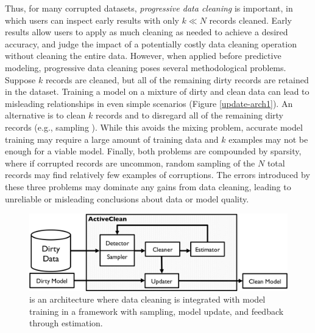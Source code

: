 Thus, for many corrupted datasets, \emph{progressive data cleaning} is important, in which users can inspect early results with only $k \ll N$ records cleaned.
Early results allow users to apply as much cleaning as needed to achieve a desired accuracy, and judge the impact of a potentially costly data cleaning operation without cleaning the entire data.
However, when applied before predictive modeling, progressive data cleaning poses several methodological problems.
Suppose $k$ records are cleaned, but all of the remaining dirty records are retained in the dataset.
Training a model on a mixture of dirty and clean data can lead to misleading relationships in even simple scenarios (Figure \ref{update-arch1}).
An alternative is to clean $k$ records and to disregard all of the remaining dirty records (e.g., sampling \cite{wang1999sample}).
While this avoids the mixing problem, accurate model training may require a large amount of training data and $k$ examples may not be enough for a viable model.
Finally, both problems are compounded by sparsity, where if corrupted records are uncommon, random sampling of the $N$ total records may find relatively few examples of corruptions.
The errors introduced by these three problems may dominate any gains from data cleaning, leading to unreliable or misleading conclusions about data or model quality.

\begin{figure}[t]
\centering
 \includegraphics[width=\columnwidth]{figs/arch.png}
 \caption{\sysfull is an architecture where data cleaning is integrated with model training in a framework with sampling, model update, and feedback through estimation. \label{sys-arch}}\vspace{-2em}
\end{figure}

